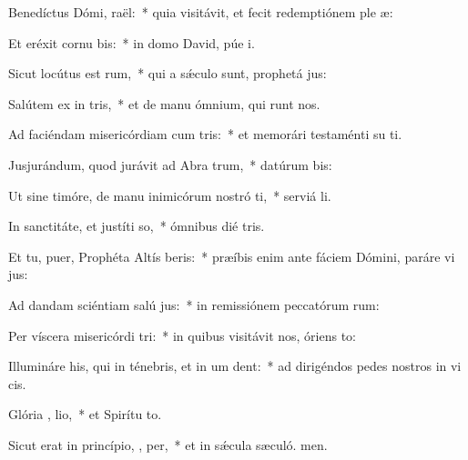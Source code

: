 \item Benedíctus Dómi,  raël:~* quia visitávit, et fecit redemptiónem ple æ:
\item Et eréxit cornu  bis:~* in domo David, púe i.
\item Sicut locútus est   rum,~* qui a sǽculo sunt, prophetá jus:
\item Salútem ex in tris,~* et de manu ómnium, qui runt nos.
\item Ad faciéndam misericórdiam cum  tris:~* et memorári testaménti su ti.
\item Jusjurándum, quod jurávit ad Abra  trum,~* datúrum  bis:
\item Ut sine timóre, de manu inimicórum nostró ti,~* serviá li.
\item In sanctitáte, et justíti  so,~* ómnibus dié tris.
\item Et tu, puer, Prophéta Altís beris:~* præíbis enim ante fáciem Dómini, paráre vi jus:
\item Ad dandam sciéntiam salú  jus:~* in remissiónem peccatórum rum:
\item Per víscera misericórdi  tri:~* in quibus visitávit nos, óriens  to:
\item Illumináre his, qui in ténebris, et in um  dent:~* ad dirigéndos pedes nostros in vi cis.
\item Glória ,  lio,~* et Spirítu to.
\item Sicut erat in princípio,  ,  per,~* et in sǽcula sæculó. men.

